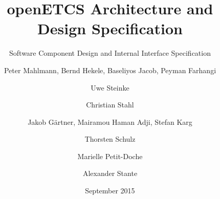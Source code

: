 \documentclass[oneside]{template/openetcs_report}
\begin{document}
\frontmatter
{}

\newcommand{\define}[1]{\index{#1}\emph{#1}}







\title{openETCS Architecture and Design Specification}

\subtitle{Software Component Design and Internal Interface Specification}

\date{September 2015}








\author{Peter Mahlmann, Bernd Hekele, Baseliyos Jacob, Peyman Farhangi}

\author{Uwe Steinke}

\author{Christian Stahl}

\author{Jakob G\"artner, Mairamou Haman Adji, Stefan Karg}


\author{Thorsten Schulz}

\author{Marielle Petit-Doche}



\author{Alexander Stante}
\end{document}
